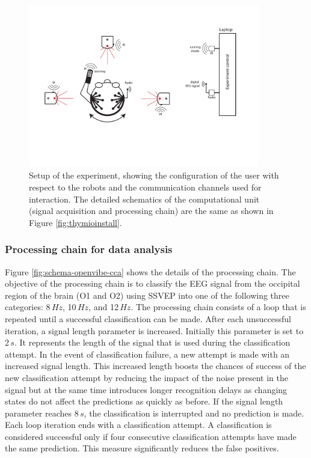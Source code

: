 \documentclass[smallextended]{svjour3}
\begin{document}
\begin{figure}
\center
\includegraphics[width=0.9\textwidth]{figures/schema-global2.pdf}
    \caption{Setup of the experiment, showing the configuration of the user with respect to the robots and the communication channels used for interaction. The detailed schematics of the computational unit (signal acquisition and processing chain) are the same as shown in Figure \ref{fig:thymioinstall}.} \label{fig:experiment-set-up}
\end{figure}

\subsubsection{Processing chain for data analysis}
Figure \ref{fig:schema-openvibe-cca} shows the details of the processing chain.
The objective of the processing chain is to classify the EEG signal from the occipital region of the brain (O1 and O2) using SSVEP into one of the following three categories: 8\,$Hz$, 10\,$Hz$, and 12\,$Hz$.
The processing chain consists of a loop that is repeated until a successful classification can be made.
After each unsuccessful iteration, a signal length parameter is increased. Initially this parameter is set to 2\,$s$.
It represents the length of the signal that is used during the classification attempt.
In the event of classification failure, a new attempt is made with an increased signal length.
This increased length boosts the chances of success of the new classification attempt by reducing the impact of the noise present in the signal
but at the same time introduces longer recognition delays as changing states do not affect the predictions as quickly as before.
If the signal length parameter reaches 8\,$s$, the classification is interrupted and no prediction is made.
Each loop iteration ends with a classification attempt.
A classification is considered successful only if four consecutive classification attempts have made the same prediction. This measure significantly reduces the false positives.
\end{document}
